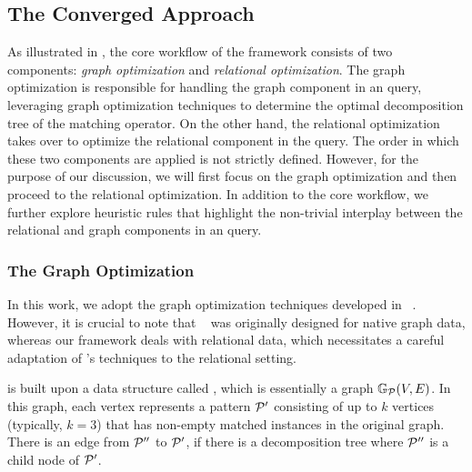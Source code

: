 \subsection{The Converged Approach}
\label{sec:converged}
As illustrated in , the core workflow of the \name framework consists of two components: \emph{graph optimization} and \emph{relational optimization}. The graph optimization is responsible for handling the graph component in an \spjm query, leveraging graph optimization techniques to determine the optimal decomposition tree of the matching operator. On the other hand, the relational optimization takes over to optimize the relational component in the query.
The order in which these two components are applied is not strictly defined. However, for the purpose of our discussion, we will first focus on the graph optimization and then proceed to the relational optimization.
In addition to the core workflow, we further explore heuristic rules that highlight the non-trivial interplay between the relational and graph components in an \spjm query.




\subsubsection{The Graph Optimization}
\label{sec:graph-optimizer}
In this work, we adopt the graph optimization techniques developed in \glogs~\cite{GLogS}. However, it is crucial to note that \glogs~ was originally designed for native graph data, whereas our framework deals with relational data, which necessitates a careful adaptation of \glogs's techniques to the relational setting.

 \glogs is built upon a data structure called \glogue, which is essentially a graph $\mathbb{G}_{\mathcal{P}}(V, E)$. In this graph, each vertex represents a pattern $\mathcal{P}'$ consisting of up to $k$ vertices (typically, $k=3$) that has non-empty matched instances in the original graph. There is an edge from $\mathcal{P}''$ to $\mathcal{P}'$, if there is a decomposition tree where $\mathcal{P}''$ is a child node of $\mathcal{P}'$.


